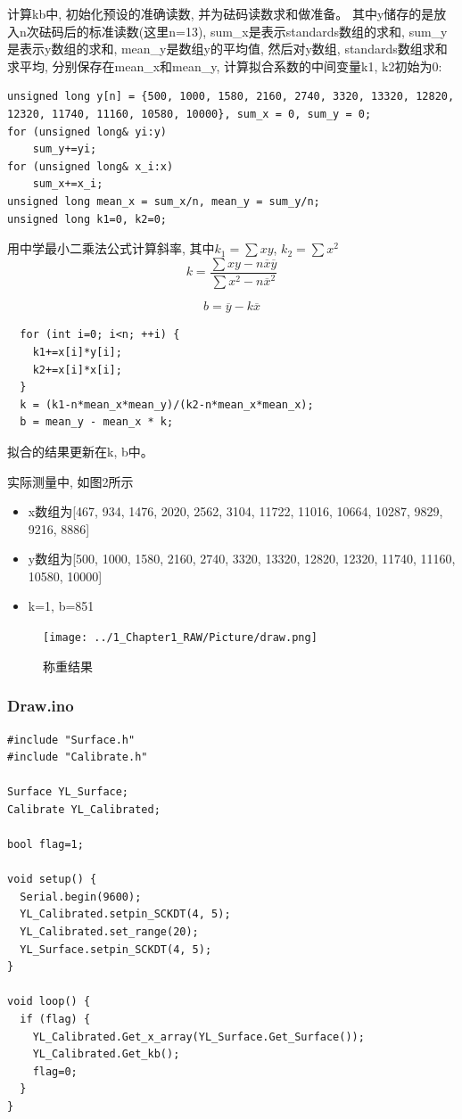 \documentclass{article}
\begin{document}
计算kb中, 初始化预设的准确读数, 并为砝码读数求和做准备。
其中y储存的是放入n次砝码后的标准读数(这里n=13), sum\_x是表示standards数组的求和, sum\_y是表示y数组的求和, mean\_y是数组y的平均值, 
然后对y数组, standards数组求和求平均, 分别保存在mean\_x和mean\_y, 计算拟合系数的中间变量k1, k2初始为0:

\begin{lstlisting}
unsigned long y[n] = {500, 1000, 1580, 2160, 2740, 3320, 13320, 12820, 12320, 11740, 11160, 10580, 10000}, sum_x = 0, sum_y = 0;
for (unsigned long& yi:y) 
    sum_y+=yi;
for (unsigned long& x_i:x) 
    sum_x+=x_i;
unsigned long mean_x = sum_x/n, mean_y = sum_y/n;
unsigned long k1=0, k2=0;  
\end{lstlisting}

用中学最小二乘法公式计算斜率, 其中$k_1 = \sum xy$, $k_2 = \sum x^2$
\begin{equation}
	k = \frac{\sum xy - n\overline{x}\overline{y}}{\sum x^2 - n \overline{x}^2}
\end{equation}

\begin{equation}
	b = \overline{y}- k \overline{x}
\end{equation}

\begin{lstlisting}
  for (int i=0; i<n; ++i) {
    k1+=x[i]*y[i];
    k2+=x[i]*x[i];
  }
  k = (k1-n*mean_x*mean_y)/(k2-n*mean_x*mean_x);
  b = mean_y - mean_x * k;
\end{lstlisting}
拟合的结果更新在k, b中。

实际测量中, 如图2所示
\begin{itemize}
  \item x数组为[467, 934, 1476, 2020, 2562, 3104, 11722, 11016, 10664, 10287, 9829, 9216, 8886]
  \item y数组为[500, 1000, 1580, 2160, 2740, 3320, 13320, 12820, 12320, 11740, 11160, 10580, 10000]
  \item k=1, b=851
\end{itemize}
\begin{figure}[h]
	\centering
	\texttt{[image: ../1\_Chapter1\_RAW/Picture/draw.png]}
	\caption{称重结果}
	\label{fig:称重结果}
	\hfill
\end{figure}

\subsubsection{Draw.ino}
\begin{lstlisting}
#include "Surface.h"
#include "Calibrate.h"

Surface YL_Surface;
Calibrate YL_Calibrated;

bool flag=1;

void setup() {
  Serial.begin(9600);
  YL_Calibrated.setpin_SCKDT(4, 5);
  YL_Calibrated.set_range(20);
  YL_Surface.setpin_SCKDT(4, 5);
}

void loop() {
  if (flag) {
    YL_Calibrated.Get_x_array(YL_Surface.Get_Surface());
    YL_Calibrated.Get_kb();
    flag=0;
  }
}
\end{lstlisting}
\end{document}
